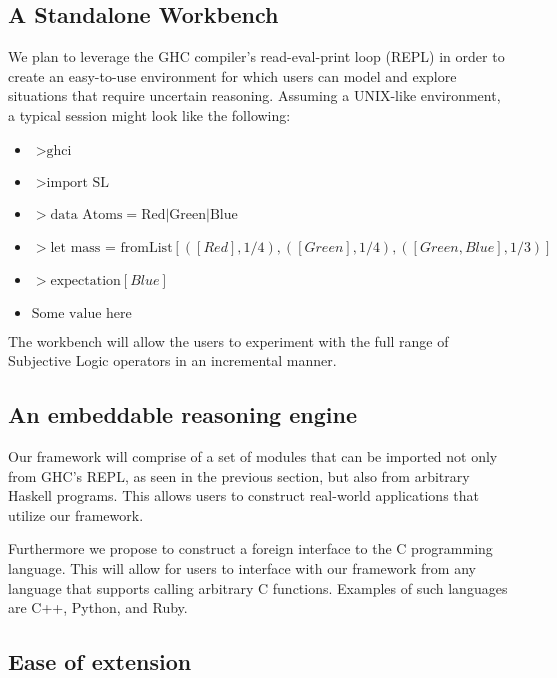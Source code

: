 \documentclass[a4paper]{article}
\begin{document}
\subsection{A Standalone Workbench}

\par
We plan to leverage the GHC compiler's read-eval-print loop (REPL) in order to create an easy-to-use environment
for which users can model and explore situations that require uncertain reasoning. Assuming a UNIX-like
environment, a typical session might look like the following:

\begin{itemize}
	\item $> \mbox{ghci}$
	\item $> \mbox{import SL}$
	\item $> \mbox{data Atoms} = \mbox{Red} | \mbox{Green} | \mbox{Blue}$
	\item $> \mbox{let mass = fromList} [ ([Red], 1/4), ([Green], 1/4), ([Green, Blue], 1/3) ]$
	\item $> \mbox{expectation} [Blue]$
	\item $\mbox{Some value here}$
\end{itemize}

\par
The workbench will allow the users to experiment with the full range of Subjective Logic operators in
an incremental manner.

\subsection{An embeddable reasoning engine}

\par
Our framework will comprise of a set of modules that can be imported not only from GHC's REPL, as seen
in the previous section, but also from arbitrary Haskell programs. This allows users to construct
real-world applications that utilize our framework. 

\par
Furthermore we propose to construct a foreign interface to the C programming language. This will allow
for users to interface with our framework from any language that supports calling arbitrary C functions.
Examples of such languages are C++, Python, and Ruby.

\subsection{Ease of extension}
\end{document}
